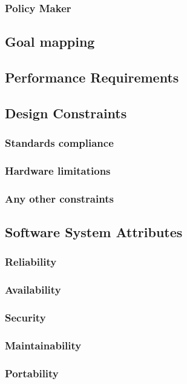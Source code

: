 \subsubsection{Policy Maker}
%






%

% 
\subsection{Goal mapping}


\subsection{Performance Requirements}
\subsection{Design Constraints}
\subsubsection{Standards compliance}
\subsubsection{Hardware limitations}
\subsubsection{Any other constraints}
\subsection{Software System Attributes}
\subsubsection{Reliability}
\subsubsection{Availability}
\subsubsection{Security}
\subsubsection{Maintainability}
\subsubsection{Portability}